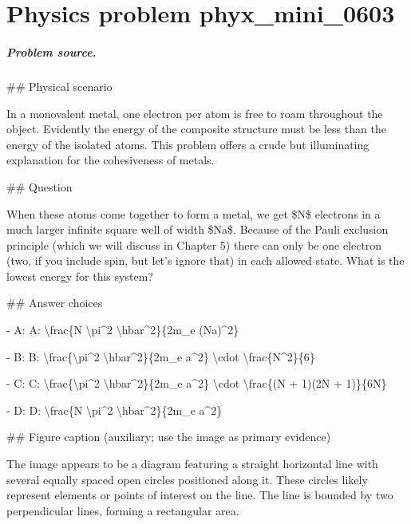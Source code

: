 
\chapter{Physics problem phyx\_mini\_0603}
\label{ch:PhyXMiniProblems_problem_phyx_mini_0603}

\paragraph{Problem source.}
\#\# Physical scenario

In a monovalent metal, one electron per atom is free to roam throughout the object. Evidently the energy of the composite structure must be less than the energy of the isolated atoms. This problem offers a crude but illuminating explanation for the cohesiveness of metals.

\#\# Question

When these atoms come together to form a metal, we get \$N\$ electrons in a much larger infinite square well of width \$Na\$. Because of the Pauli exclusion principle (which we will discuss in Chapter 5) there can only be one electron (two, if you include spin, but let's ignore that) in each allowed state. What is the lowest energy for this system?

\#\# Answer choices

- A: A: \textbackslash{}frac\{N \textbackslash{}pi\textasciicircum{}2 \textbackslash{}hbar\textasciicircum{}2\}\{2m\_e (Na)\textasciicircum{}2\}

- B: B: \textbackslash{}frac\{\textbackslash{}pi\textasciicircum{}2 \textbackslash{}hbar\textasciicircum{}2\}\{2m\_e a\textasciicircum{}2\} \textbackslash{}cdot \textbackslash{}frac\{N\textasciicircum{}2\}\{6\}

- C: C: \textbackslash{}frac\{\textbackslash{}pi\textasciicircum{}2 \textbackslash{}hbar\textasciicircum{}2\}\{2m\_e a\textasciicircum{}2\} \textbackslash{}cdot \textbackslash{}frac\{(N + 1)(2N + 1)\}\{6N\}

- D: D: \textbackslash{}frac\{N \textbackslash{}pi\textasciicircum{}2 \textbackslash{}hbar\textasciicircum{}2\}\{2m\_e a\textasciicircum{}2\}

\#\# Figure caption (auxiliary; use the image as primary evidence)

The image appears to be a diagram featuring a straight horizontal line with several equally spaced open circles positioned along it. These circles likely represent elements or points of interest on the line. The line is bounded by two perpendicular lines, forming a rectangular area.

